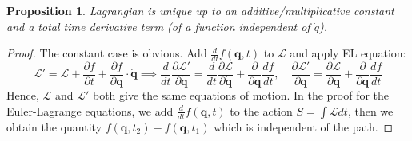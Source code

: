 \documentclass[a4paper]{article}
\theoremstyle{new}
\newtheorem{prop}{Proposition}[section]
\begin{document}
\begin{prop}
Lagrangian is unique up to an additive/multiplicative constant and a total time derivative term (of a function independent of $\dot{q}$).
\end{prop}
\begin{proof}
The constant case is obvious. Add $\frac{d}{dt}f(\mathbf{q},t)$ to $\mathcal{L}$ and apply EL equation:
$$\mathcal{L}'=\mathcal{L}+\frac{\partial f}{\partial t}+\frac{\partial f}{\partial\mathbf{q}}\cdot\mathbf{\dot{q}}\implies\frac{d}{dt}\frac{\partial\mathcal{L}'}{\partial\mathbf{\dot{q}}}=\frac{d}{dt}\frac{\partial\mathcal{L}}{\partial\mathbf{\dot{q}}}+\frac{\partial}{\partial\mathbf{q}}\frac{df}{dt},\quad\frac{\partial\mathcal{L}'}{\partial\mathbf{q}}=\frac{\partial\mathcal{L}}{\partial\mathbf{q}}+\frac{\partial}{\partial\mathbf{q}}\frac{df}{dt}$$
Hence, $\mathcal{L}$ and $\mathcal{L}'$ both give the same equations of motion. In the proof for the Euler-Lagrange equations, we add $\frac{d}{dt}f(\mathbf{q},t)$ to the action $S=\int\mathcal{L}dt$, then we obtain the quantity $f(\mathbf{q},t_2)-f(\mathbf{q},t_1)$ which is independent of the path.
\end{proof}
\end{document}
